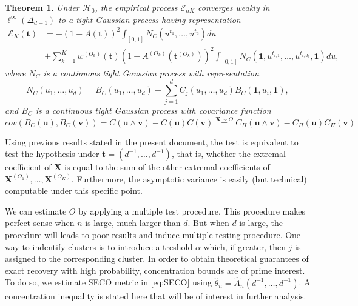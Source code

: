\documentclass[11pt]{article}
\newtheorem{theorem}{Theorem}
\begin{document}
	\begin{theorem}
		\label{thm:weak_conv}
		Under $\mathcal{H}_0$, the empirical process $\mathcal{E}_{nK}$ converges weakly in $\ell^{\infty}(\Delta_{d-1})$ to a tight Gaussian process having representation
		\begin{align*}
			\mathcal{E}_K(\textbf{t}) &= -\left(1+A(\textbf{t})\right)^2 \int_{[0,1]} N_C(u^{t_1}, \dots, u^{t_d})du \\ &+ \sum_{k=1}^K w^{(O_k)}(\textbf{t})\left(1+A^{(O_k)}(\textbf{t}^{(O_k)})\right)^2 \int_{[0,1]} N_C(\textbf{1},u^{t_{i,1}}, \dots, u^{t_{i,d_k}}, \textbf{1})du,
		\end{align*}
		where $N_C$ is a continuous tight Gaussian process with representation 
		\begin{equation*}
			N_C(u_1,\dots,u_d) = B_C(u_1, \dots, u_d) - \sum_{j=1}^d \dot{C}_j(u_1, \dots, u_d) B_C(\textbf{1}, u_i, \textbf{1}),
		\end{equation*}
		and $B_C$ is a continuous tight Gaussian process with covariance function
		\begin{equation*}
			cov(B_C(\textbf{u}), B_C(\textbf{v})) = C(\textbf{u} \wedge \textbf{v}) - C(\textbf{u})C(\textbf{v}) \overset{\textbf{X}\sim O}{=} C_{\Pi}(\textbf{u} \wedge \textbf{v}) - C_{\Pi}(\textbf{u})C_{\Pi}(\textbf{v})
		\end{equation*}
	\end{theorem}
	Using previous results stated in the present document, the test is equivalent to test the hypothesis under $\textbf{t} = (d^{-1},\dots,d^{-1})$, that is, whether the extremal coefficient of $\textbf{X}$ is equal to the sum of the other extremal coefficients of $\textbf{X}^{(O_1)}, \dots, \textbf{X}^{(O_K)}$. Furthermore, the asymptotic variance is easily (but technical) computable under this specific point.
	
	We can estimate $\bar{O}$ by applying a multiple test procedure. This procedure makes perfect sense when $n$ is large, much larger than $d$. But when $d$ is large, the procedure will leads to poor results and induce multiple testing procedure. One way to indentify clusters is to introduce a treshold $\alpha$ which, if greater, then $j$ is assigned to the corresponding cluster. In order to obtain theoretical guarantees of exact recovery with high probability, concentration bounds are of prime interest. To do so, we estimate SECO metric in \eqref{eq:SECO} using $\hat{\theta}_n = \hat{A}_n(d^{-1},\dots,d^{-1})$. A concentration inequality is stated here that will be of interest in further analysis.
	
\end{document}
